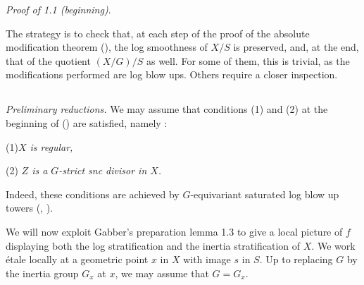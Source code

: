\documentclass[10pt]{../fichiers-configuration-latex/smfart}
\begin{document}
\medskip \textit{Proof of 1.1 (beginning)}.

\medskip The strategy is to check that, at each step of the proof of the
absolute modification theorem (), the log
smoothness of $X/S$ is preserved, and, at the end, that of the quotient
$(X/G)/S$ as well. For some of them, this is trivial, as the modifications
performed are log blow ups. Others require a closer inspection.

\subsection{}\label{10-preliminary} \textit{Preliminary reductions.} We
may assume that conditions (1) and (2) at the beginning of  ()
are satisfied, namely :

(1)\textit{$X$ is regular,}

(2) \textit{$Z$ is a $G$-strict snc divisor in $X$.}

Indeed, these conditions are achieved by $G$-equivariant saturated log blow
up towers (, ).

We will now exploit Gabber's preparation lemma 1.3 to give a local picture
of $f$ displaying both the log stratification and the inertia stratification
of $X$. We work étale locally at a geometric point $x$ in $X$ with image $s$
in $S$. Up to replacing $G$ by the inertia group $G_x$ at $x$, we may assume
that $G = G_x$.
\end{document}
